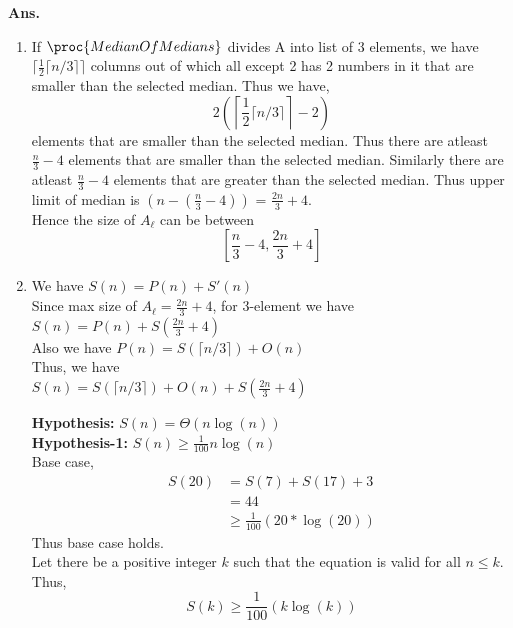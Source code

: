 \documentclass[11pt]{article}
\begin{document}
\noindent \textbf{Ans.}
\begin{enumerate}
    \item If $\proc{MedianOfMedians}$ divides A into list of 3 elements, we  have $\lceil \frac{1}{2}\lceil n/3 \rceil\rceil$  columns out of which all except 2 has 2 numbers in it that are smaller than the selected median. Thus we have,
    $$2\left(\left\lceil \frac{1}{2}\lceil n/3 \rceil\right\rceil-2\right)$$
    elements that are smaller than the selected median.
    Thus there are atleast $\frac{n}{3} -4$ elements that are smaller than the selected median.
    Similarly there are atleast $\frac{n}{3} -4$ elements that are greater than the selected median.
    Thus upper limit of median is $(n-(\frac{n}{3} -4))$ = $\frac{2n}{3} +4$.\\
    Hence the size of $A_{\ell}$ can be between
    $$\left[\frac{n}{3} -4, \frac{2n}{3} +4\right]$$
    
    \item We have $S(n) = P(n)+S'(n)$\\
    Since max size of $A_{\ell} = \frac{2n}{3} +4$, for 3-element we have\\
    $S(n) = P(n)+S(\frac{2n}{3} +4)$\\
    Also we have $P(n) = S(\lceil n/3 \rceil) + O(n)$\\
    Thus, we have\\
    $S(n) = S(\lceil n/3 \rceil) + O(n)+S(\frac{2n}{3} +4)$
    
    \noindent \textbf{Hypothesis:} $S(n) = \Theta(n\log(n))$\\
    \textbf{Hypothesis-1:} $S(n) \geq \frac{1}{100}n\log(n)$\\
    \noindent Base case, 
    \begin{equation}
        \begin{split}
           S(20) &= S(7)+S(17)+3\\
           &= 44\\
           &\geq \frac{1}{100}(20*\log(20))
        \end{split}
    \end{equation}
    Thus base case holds.\\
    \noindent Let there be a positive integer $k$ such that the equation is valid for all $n \leq k$. Thus,
    $$ S(k) \geq \frac{1}{100}(k\log(k))$$
    

\end{enumerate}
\end{document}

